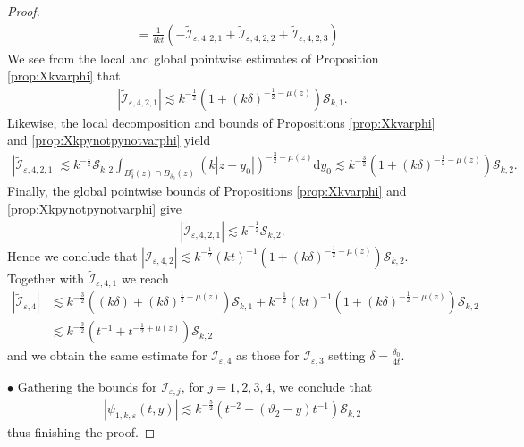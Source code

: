 \documentclass[10pt,a4paper]{amsart}
\newcommand\cI{{\mathcal I}}
\newcommand\cS{{\mathcal S}}
\newcommand{\bullpar}[1]{\vspace{.5em}\noindent $\bullet$ \normalfont {\bfseries #1.}}
\newcommand{\ep}{\varepsilon}
\renewcommand{\d}{\mathrm{d}}
\begin{document}
\begin{proof}
\begin{align*}
&= \frac{1}{ikt}\left( -\widetilde\cI_{\ep,4,2,1} + \widetilde\cI_{\ep,4,2,2} + \widetilde\cI_{\ep,4,2,3} \right)
\end{align*}
We see from the local and global pointwise estimates of Proposition \ref{prop:Xkvarphi} that
\begin{align*}
\left|\widetilde\cI_{\ep,4,2,1} \right| \lesssim k^{-\frac12} \left( 1 + (k\delta)^{-\frac12-\mu(z)} \right) \cS_{k,1}.
\end{align*}
Likewise, the local decomposition and bounds of Propositions \ref{prop:Xkvarphi} and \ref{prop:Xkpynotpynotvarphi} yield
\begin{align*}
\left|\widetilde\cI_{\ep,4,2,1} \right| \lesssim k^{-\frac12}\cS_{k,2}\int_{B_\delta^c(z)\cap B_{\delta_0}(z)} (k|z-y_0|)^{-\frac32-\mu(z)} \d y_0 \lesssim k^{-\frac32}\left( 1 + (k\delta)^{-\frac12-\mu(z)}\right)\cS_{k,2}.
\end{align*}
Finally, the global pointwise bounds of Propositions \ref{prop:Xkvarphi} and \ref{prop:Xkpynotpynotvarphi} give
\begin{align*}
\left|\widetilde\cI_{\ep,4,2,1} \right| \lesssim k^{-\frac12}\cS_{k,2}.
\end{align*}
Hence we conclude that $\left| \widetilde\cI_{\ep,4,2} \right| \lesssim k^{-\frac12}(kt)^{-1}\left( 1 + (k\delta)^{-\frac12-\mu(z)} \right) \cS_{k,2}$. Together with $\widetilde\cI_{\ep,4,1}$ we reach
\begin{align*}
\left| \widetilde\cI_{\ep,4} \right| &\lesssim k^{-\frac32} \left( (k\delta) + (k\delta)^{\frac12-\mu(z)}\right) \cS_{k,1} + k^{-\frac12}(kt)^{-1}\left( 1 + (k\delta)^{-\frac12-\mu(z)} \right) \cS_{k,2} \\
&\lesssim k^{-\frac32} \left( t^{-1} + t^{-\frac12+\mu(z)} \right) \cS_{k,2}
\end{align*}
and we obtain the same estimate for $\cI_{\ep,4}$ as those for $\cI_{\ep,3}$ setting $\delta = \frac{\delta_0}{4t}$.

\bullpar{End of proof} Gathering the bounds for $\cI_{\ep,j}$, for $j=1,2,3,4$, we conclude that 
\begin{align*}
\left| \psi_{1,k,\ep}(t,y) \right| \lesssim k^{-\frac52}\left( t^{-2} + (\vartheta_2-y)t^{-1} \right)\cS_{k,2} 
\end{align*}
thus finishing the proof.
\end{proof}
\end{document}

